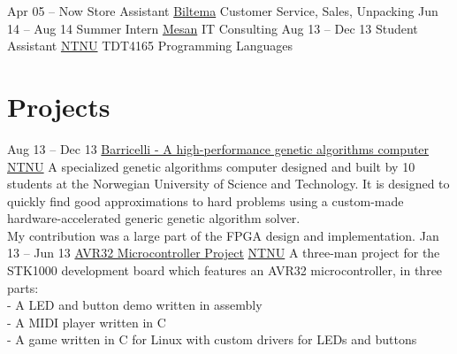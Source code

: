 \documentclass[print]{friggeri-cv}
\begin{document}
\begin{entrylist}
    \entry
        {Apr 05 – Now}
        {Store Assistant}
        {\href{http://biltema.no/}{Biltema}}
        {Customer Service, Sales, Unpacking}
    \entry
        {Jun 14 – Aug 14}
        {Summer Intern}
        {\href{http://mesan.no/}{Mesan}}
        {IT Consulting}
    \entry
        {Aug 13 – Dec 13}
        {Student Assistant}
        {\href{http://ntnu.no/}{NTNU}}
        {TDT4165 Programming Languages}
\end{entrylist}

\section{Projects}

\begin{entrylist}
    \entry
        {Aug 13 – Dec 13}
        {\href{http://barricel.li/}{Barricelli - A high-performance genetic algorithms computer}}
        {\href{http://ntnu.no/}{NTNU}}
        {A specialized genetic algorithms computer designed and built by 10 students at the Norwegian University of Science and Technology. It is designed to quickly find good approximations to hard problems using a custom-made hardware-accelerated generic genetic algorithm solver.\\
        My contribution was a large part of the FPGA design and implementation.}
    \entry
        {Jan 13 – Jun 13}
        {\href{https://github.com/lundal/avr32-project-2013}{AVR32 Microcontroller Project}}
        {\href{http://ntnu.no/}{NTNU}}
        {A three-man project for the STK1000 development board which features an AVR32 microcontroller, in three parts:\\
        - A LED and button demo written in assembly\\
        - A MIDI player written in C\\
        - A game written in C for Linux with custom drivers for LEDs and buttons}
\end{entrylist}
\end{document}
